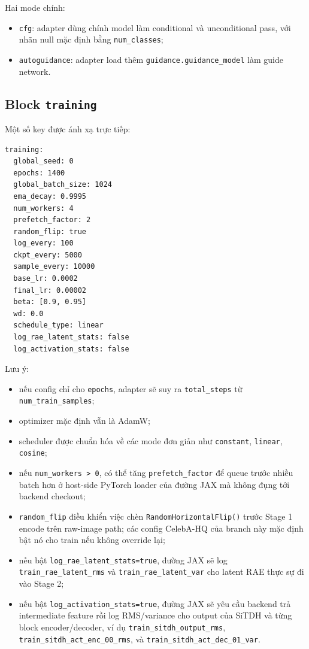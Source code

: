 Hai mode chính:

\begin{itemize}[leftmargin=1.5em]
  \item \texttt{cfg}: adapter dùng chính model làm conditional và unconditional
  pass, với nhãn null mặc định bằng \texttt{num\_classes};
  \item \texttt{autoguidance}: adapter load thêm
  \texttt{guidance.guidance\_model} làm guide network.
\end{itemize}

\subsection{Block \texttt{training}}

Một số key được ánh xạ trực tiếp:

\begin{lstlisting}[style=rae]
training:
  global_seed: 0
  epochs: 1400
  global_batch_size: 1024
  ema_decay: 0.9995
  num_workers: 4
  prefetch_factor: 2
  random_flip: true
  log_every: 100
  ckpt_every: 5000
  sample_every: 10000
  base_lr: 0.0002
  final_lr: 0.00002
  beta: [0.9, 0.95]
  wd: 0.0
  schedule_type: linear
  log_rae_latent_stats: false
  log_activation_stats: false
\end{lstlisting}

Lưu ý:

\begin{itemize}[leftmargin=1.5em]
  \item nếu config chỉ cho \texttt{epochs}, adapter sẽ suy ra
  \texttt{total\_steps} từ \texttt{num\_train\_samples};
  \item optimizer mặc định vẫn là AdamW;
  \item scheduler được chuẩn hóa về các mode đơn giản như
  \texttt{constant}, \texttt{linear}, \texttt{cosine};
  \item nếu \texttt{num\_workers > 0}, có thể tăng
  \texttt{prefetch\_factor} để queue trước nhiều batch hơn ở host-side
  PyTorch loader của đường JAX mà không đụng tới backend checkout;
  \item \texttt{random\_flip} điều khiển việc chèn
  \texttt{RandomHorizontalFlip()} trước Stage 1 encode trên raw-image path;
  các config CelebA-HQ của branch này mặc định bật nó cho train nếu không
  override lại;
  \item nếu bật \texttt{log\_rae\_latent\_stats=true}, đường JAX sẽ log
  \texttt{train\_rae\_latent\_rms} và \texttt{train\_rae\_latent\_var} cho
  latent RAE thực sự đi vào Stage 2;
  \item nếu bật \texttt{log\_activation\_stats=true}, đường JAX sẽ yêu cầu
  backend trả intermediate feature rồi log RMS/variance cho output của SiTDH
  và từng block encoder/decoder, ví dụ
  \texttt{train\_sitdh\_output\_rms},
  \texttt{train\_sitdh\_act\_enc\_00\_rms}, và
  \texttt{train\_sitdh\_act\_dec\_01\_var}.
\end{itemize}

